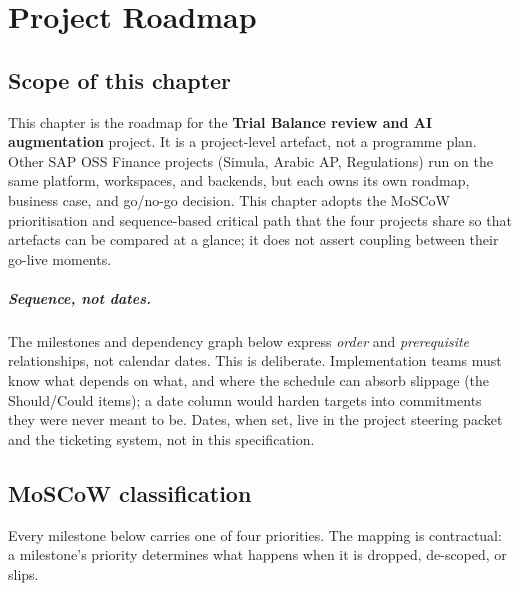 \chapter{Project Roadmap}\label{ch:tb-roadmap}

\section*{Scope of this chapter}

This chapter is the roadmap for the \textbf{Trial Balance review and AI
augmentation} project. It is a project-level artefact, not a programme
plan. Other SAP OSS Finance projects (Simula, Arabic AP, Regulations)
run on the same platform, workspaces, and backends, but each owns its
own roadmap, business case, and go/no-go decision. This chapter adopts
the MoSCoW prioritisation and sequence-based critical path that the
four projects share so that artefacts can be compared at a glance; it
does not assert coupling between their go-live moments.

\paragraph{Sequence, not dates.}
The milestones and dependency graph below express \emph{order} and
\emph{prerequisite} relationships, not calendar dates. This is
deliberate. Implementation teams must know what depends on what, and
where the schedule can absorb slippage (the Should/Could items); a
date column would harden targets into commitments they were never
meant to be. Dates, when set, live in the project steering packet and
the ticketing system, not in this specification.

\section{MoSCoW classification}\label{sec:tb-moscow}

Every milestone below carries one of four priorities. The mapping is
contractual: a milestone's priority determines what happens when it is
dropped, de-scoped, or slips.

